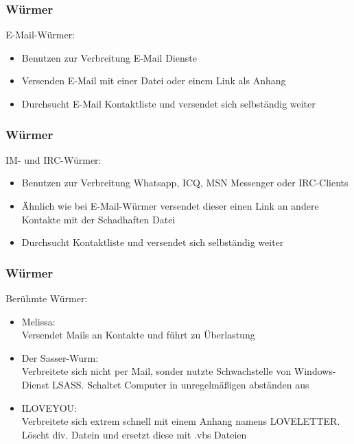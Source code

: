 \documentclass{beamer}
\begin{document}
\begin{frame}
	\frametitle{Würmer}
		\begin{block}{E-Mail-Würmer:}
			\begin{itemize}
				\item Benutzen zur Verbreitung E-Mail Dienste
				\item Versenden E-Mail mit einer Datei oder einem Link als Anhang
				\item Durchsucht E-Mail Kontaktliste und versendet sich selbständig weiter
			\end{itemize}
		\end{block}
\end{frame}

\begin{frame}
	\frametitle{Würmer}
		\begin{block}{IM- und IRC-Würmer:}
			\begin{itemize}
				\item Benutzen zur Verbreitung Whatsapp, ICQ, MSN Messenger oder IRC-Clients
				\item Ähnlich wie bei E-Mail-Würmer versendet dieser einen Link an andere Kontakte mit der Schadhaften Datei
				\item Durchsucht Kontaktliste und versendet sich selbständig weiter
			\end{itemize}
		\end{block}
\end{frame}

\begin{frame}
	\frametitle{Würmer}
		\begin{block}{Berühmte Würmer:}
			\begin{itemize}
				\item Melissa:\\
				Versendet Mails an Kontakte und führt zu Überlastung
				\item Der Sasser-Wurm:\\
				Verbreitete sich nicht per Mail, sonder nutzte Schwachstelle von Windows-Dienst LSASS. Schaltet Computer in unregelmäßigen abständen aus
				\item ILOVEYOU:\\
				Verbreitete sich extrem schnell mit einem Anhang namens LOVELETTER. Löscht div. Datein und ersetzt diese mit .vbs Dateien
				
			\end{itemize}
		\end{block}
\end{frame}
\end{document}
